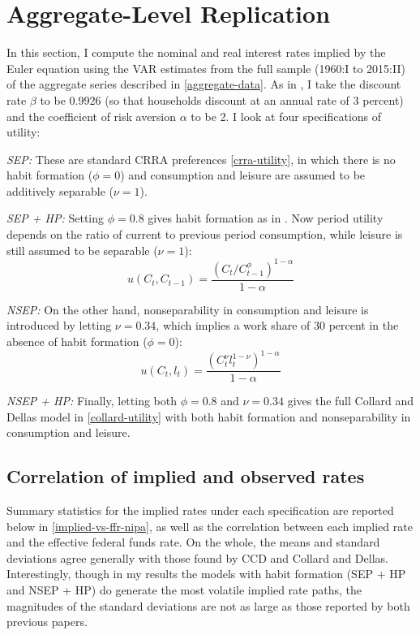 \section{Aggregate-Level Replication}
In this section, I compute the nominal and real interest rates implied by the Euler equation using the VAR estimates from the full sample (1960:I to 2015:II) of the aggregate series described in \autoref{aggregate-data}. As in \cite{collard11}, I take the discount rate $\beta$ to be 0.9926 (so that households discount at an annual rate of 3 percent) and the coefficient of risk aversion $\alpha$ to be 2. I look at four specifications of utility:

\textit{SEP:} These are standard CRRA preferences \eqref{crra-utility}, in which there is no habit formation ($\phi = 0$) and consumption and leisure are assumed to be additively separable ($\nu = 1$).

\textit{SEP + HP:} Setting $\phi = 0.8$ gives habit formation as in \cite{fuhrer00}. Now period utility depends on the ratio of current to previous period consumption, while leisure is still assumed to be separable ($\nu = 1$): $$u(C_t, C_{t-1}) = \frac{(C_t/C_{t-1}^\phi)^{1-\alpha}}{1-\alpha}$$

\textit{NSEP:} On the other hand, nonseparability in consumption and leisure is introduced by letting $\nu = 0.34$, which implies a work share of 30 percent in the absence of habit formation ($\phi = 0$): $$u(C_t, l_t) = \frac{(C_t^\nu l_t^{1-\nu})^{1-\alpha}}{1-\alpha}$$

\textit{NSEP + HP:} Finally, letting both $\phi = 0.8$ and $\nu = 0.34$ gives the full Collard and Dellas model in \eqref{collard-utility} with both habit formation and nonseparability in consumption and leisure.



\subsection{Correlation of implied and observed rates}
Summary statistics for the implied rates under each specification are reported below in \autoref{implied-vs-ffr-nipa}, as well as the correlation between each implied rate and the effective federal funds rate. On the whole, the means and standard deviations agree generally with those found by CCD and Collard and Dellas. Interestingly, though in my results the models with habit formation (SEP + HP and NSEP + HP) do generate the most volatile implied rate paths, the magnitudes of the standard deviations are not as large as those reported by both previous papers.

